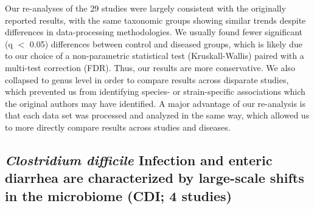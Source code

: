 {Our re-analyses of the 29 studies were largely consistent with the originally reported results, with the same taxonomic groups showing similar trends despite differences in data-processing methodologies.
We usually found fewer significant (q $<$ 0.05) differences between control and diseased groups, which is likely due to our choice of a non-parametric statistical test (Kruskall-Wallis) paired with a multi-test correction (FDR).
Thus, our results are more conservative.
We also collapsed to genus level in order to compare results across disparate studies, which prevented us from identifying species- or strain-specific associations which the original authors may have identified.
A major advantage of our re-analysis is that each data set was processed and analyzed in the same way, which allowed us to more directly compare results across studies and diseases.

\subsection*{\textit{Clostridium difficile} Infection and enteric diarrhea are characterized by large-scale shifts in the microbiome (CDI; 4 studies)}

}
